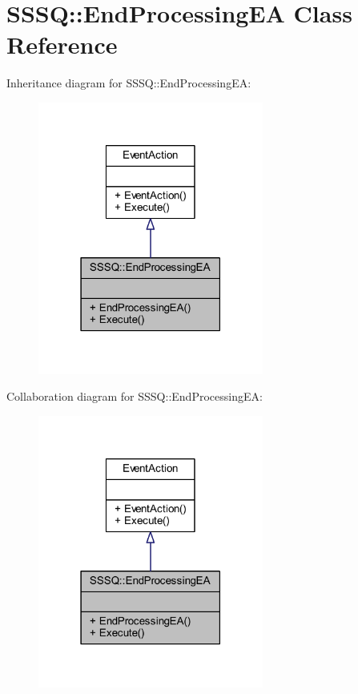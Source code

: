 \hypertarget{class_s_s_s_q_1_1_end_processing_e_a}{}\section{S\+S\+SQ\+:\+:End\+Processing\+EA Class Reference}
\label{class_s_s_s_q_1_1_end_processing_e_a}


Inheritance diagram for S\+S\+SQ\+:\+:End\+Processing\+EA\+:\nopagebreak
\begin{figure}[H]
\begin{center}
\leavevmode
\includegraphics[width=210pt]{class_s_s_s_q_1_1_end_processing_e_a__inherit__graph}
\end{center}
\end{figure}


Collaboration diagram for S\+S\+SQ\+:\+:End\+Processing\+EA\+:\nopagebreak
\begin{figure}[H]
\begin{center}
\leavevmode
\includegraphics[width=210pt]{class_s_s_s_q_1_1_end_processing_e_a__coll__graph}
\end{center}
\end{figure}
